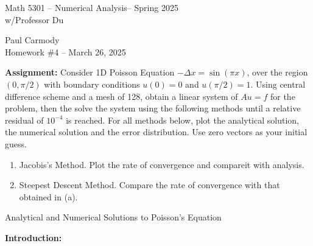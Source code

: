 \documentclass[12pt,a4paper]{report}
\newcommand{\CLASSNAME}{Math 5301 -- Numerical Analysis}
\newcommand{\STUDENTNAME}{Paul Carmody}
\newcommand{\ASSIGNMENT}{Homework \#4 }
\newcommand{\DUEDATE}{March 26, 2025}
\newcommand{\SEMESTER}{Spring 2025}
\begin{document}

\begin{center}
	\Large{\CLASSNAME -- \SEMESTER} \\
	\large{ w/Professor Du}
\end{center}
\begin{center}
	\STUDENTNAME \\
	\ASSIGNMENT -- \DUEDATE\\
\end{center} 
\HLINE

\textbf{Assignment:} Consider 1D Poisson Equation $-\Delta x = \sin (\pi x)$, over the region $(0, \pi/2)$ with boundary conditions $u(0)=0$ and $u(\pi/2)=1$.  Using central difference scheme and a mesh of 128, obtain a linear system of $Au = f$ for the problem, then the solve the system using the following methods until a relative residual of $10^{-4}$ is reached. For all methods below, plot the analytical solution, the numerical solution and the error distribution.  Use zero vectors as your initial guess.

\begin{enumerate}[label=(\alph*)]
\item Jacobis's Method.  Plot the rate of convergence and compareit with analysis.
\item Steepest Descent Method. Compare the rate of convergence with that obtained in (a).

\end{enumerate}
\HLINE
%
%
%
%
\begin{center}
	\Large{Analytical and Numerical Solutions to Poisson's Equation}
\end{center}

\noindent\textbf{Introduction:}\\
\end{document}
